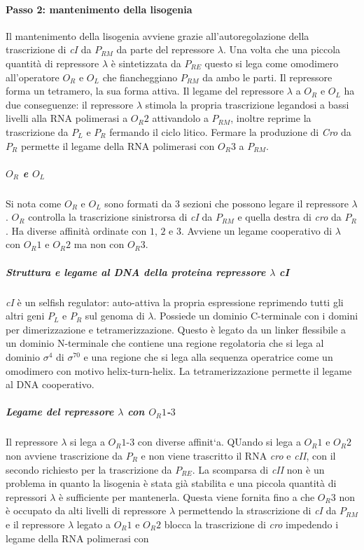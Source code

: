 \paragraph{Passo 2: mantenimento della lisogenia}
Il mantenimento della lisogenia avviene grazie all'autoregolazione della trascrizione di \emph{cI} da $P_{RM}$ da parte del repressore $\lambda$. Una volta che una piccola quantit\`a
di repressore $\lambda$ \`e sintetizzata da $P_{RE}$ questo si lega come omodimero all'operatore $O_R$ e $O_L$ che fiancheggiano $P_{RM}$ da ambo le parti. Il repressore forma un
tetramero, la sua forma attiva. Il legame del repressore $\lambda$ a $O_R$ e $O_L$ ha due conseguenze: il repressore $\lambda$ stimola la propria trascrizione legandosi a bassi 
livelli alla RNA polimerasi a $O_R2$ attivandolo a $P_{RM}$, inoltre reprime la trascrizione da $P_L$ e $P_R$ fermando il ciclo litico. Fermare la produzione di \emph{Cro} da $P_R$ 
permette il legame della RNA polimerasi con $O_R3$ a $P_{RM}$. 
\subparagraph{$O_R$ e $O_L$}
Si nota come $O_R$ e $O_L$ sono formati da $3$ sezioni che possono legare il repressore $\lambda$. $O_R$ controlla la trascrizione sinistrorsa di \emph{cI} da $P_{RM}$ e quella destra di
\emph{cro} da $P_R$. Ha diverse affinit\`a ordinate con $1$, $2$ e $3$. Avviene un legame cooperativo di $\lambda$ con $O_R1$ e $O_R2$ ma non con $O_R3$. 
\subparagraph{Struttura e legame al DNA della proteina repressore $\lambda$ \emph{cI}}
\emph{cI} \`e un selfish regulator: auto-attiva la propria espressione reprimendo tutti gli altri geni $P_L$ e $P_R$ sul genoma di $\lambda$. Possiede un dominio C-terminale con i
domini per dimerizzazione e tetramerizzazione. Questo \`e legato da un linker flessibile a un dominio N-terminale che contiene una regione regolatoria che si lega al dominio $\sigma^4$
di $\sigma^{70}$ e una regione che si lega alla sequenza operatrice come un omodimero con motivo helix-turn-helix. La tetramerizzazione permette il legame al DNA cooperativo. 
\subparagraph{Legame del repressore $\lambda$ con $O_R1$-$3$}
Il repressore $\lambda$ si lega a $O_R1$-$3$ con diverse affinit`a. QUando si lega a $O_R1$ e $O_R2$ non avviene trascrizione da $P_R$ e non viene trascritto il RNA \emph{cro} e 
\emph{cII}, con il secondo richiesto per la trascrizione da $P_{RE}$. La scomparsa di \emph{cII} non \`e un problema in quanto la lisogenia \`e stata gi\`a stabilita e una piccola
quantit\`a di repressori $\lambda$ \`e sufficiente per mantenerla. Questa viene fornita fino a che $O_R3$ non \`e occupato da alti livelli di repressore $\lambda$ permettendo 
la strascrizione di \emph{cI} da $P_{RM}$ e il repressore $\lambda$ legato a $O_R1$ e $O_R2$ blocca la trascrizione di \emph{cro} impedendo i legame della RNA polimerasi con 
